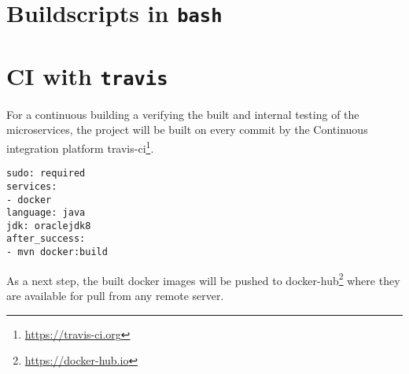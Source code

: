 \documentclass[11pt]{article}
\begin{document}
	\section{Buildscripts in \texttt{bash}}
	
	\section{CI with \texttt{travis}}
	For a continuous building a verifying the built and internal testing of the microservices, the project will be built on every commit by the Continuous integration platform travis-ci\footnote{\url{https://travis-ci.org}}.
	
	\begin{lstlisting}
sudo: required
services:
- docker
language: java
jdk: oraclejdk8
after_success:
- mvn docker:build
	\end{lstlisting}
	
	As a next step, the built docker images will be pushed to docker-hub\footnote{\url{https://docker-hub.io}} where they are available for pull from any remote server.
	
\end{document}
